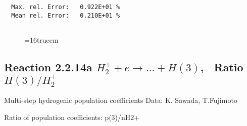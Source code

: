 \documentclass[12pt,dvipdfmx]{article}
\begin{document}
\begin{small}
\begin{verbatim}
  Max. rel. Error:   0.922E+01 %
  Mean rel. Error:   0.210E+01 %


\end{verbatim}\end{small}
\begin{figure} \label{2.2.5ly}
\epsfxsize=16truecm
\end{figure}

\newpage
\subsection{
Reaction 2.2.14a $ H_2^+ + e \rightarrow ...+ H(3) $, \  Ratio $H(3)/H_2^+ $
}

 Multi-step hydrogenic population coefficients
 Data: K. Sawada, T.Fujimoto \cite{kn:Sawada}

 Ratio of population coefficients: p(3)/nH2+
\end{document}
